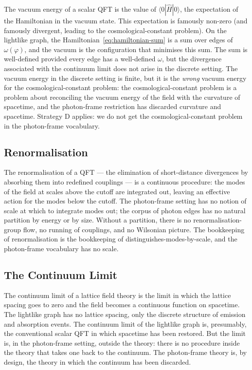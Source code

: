 \documentclass[11pt]{article}
\begin{document}
The vacuum energy of a scalar QFT is the value of $\langle 0 | \hat{H} | 0 \rangle$, the expectation of the Hamiltonian in the vacuum state. This expectation is famously non-zero (and famously divergent, leading to the cosmological-constant problem). On the lightlike graph, the Hamiltonian~\eqref{eq:hamiltonian-sum} is a sum over edges of $\omega(\varphi)$, and the vacuum is the configuration that minimises this sum. The sum is well-defined provided every edge has a well-defined $\omega$, but the divergence associated with the continuum limit does not arise in the discrete setting. The vacuum energy in the discrete setting is finite, but it is the \emph{wrong} vacuum energy for the cosmological-constant problem: the cosmological-constant problem is a problem about reconciling the vacuum energy of the field with the curvature of spacetime, and the photon-frame restriction has discarded curvature and spacetime. Strategy D applies: we do not get the cosmological-constant problem in the photon-frame vocabulary.

\subsection{Renormalisation}

The renormalisation of a QFT --- the elimination of short-distance divergences by absorbing them into redefined couplings --- is a continuous procedure: the modes of the field at scales above the cutoff are integrated out, leaving an effective action for the modes below the cutoff. The photon-frame setting has no notion of scale at which to integrate modes out; the corpus of photon edges has no natural partition by energy or by size. Without a partition, there is no renormalisation-group flow, no running of couplings, and no Wilsonian picture. The bookkeeping of renormalisation is the bookkeeping of distinguishes-modes-by-scale, and the photon-frame vocabulary has no scale.

\subsection{The Continuum Limit}

The continuum limit of a lattice field theory is the limit in which the lattice spacing goes to zero and the field becomes a continuous function on spacetime. The lightlike graph has no lattice spacing, only the discrete structure of emission and absorption events. The continuum limit of the lightlike graph is, presumably, the conventional scalar QFT in which spacetime has been restored. But the limit is, in the photon-frame setting, outside the theory: there is no procedure inside the theory that takes one back to the continuum. The photon-frame theory is, by design, the theory in which the continuum has been discarded.
\end{document}
